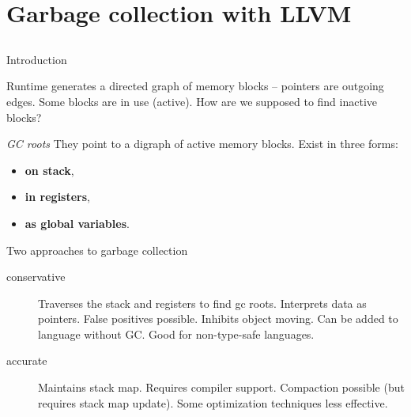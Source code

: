 \documentclass[8pt]{beamer}
\begin{document}
\section[Garbage collection]{Garbage collection with LLVM}
\subsection*{}

\begin{frame}{Introduction}
  \begin{alertblock}{}
    Runtime generates a directed graph of memory blocks -- pointers are
    outgoing edges. Some blocks are in use (active). How are we supposed to
    find inactive blocks?
  \end{alertblock}

  \begin{block}{\textit{GC roots}}
    They point to a digraph of active memory blocks. Exist in three forms:
    \begin{itemize}
      \item \textbf{on stack},
      \item \textbf{in registers},
      \item \textbf{as global variables}.
    \end{itemize}
  \end{block}

  \begin{block}{Two approaches to garbage collection}
    \begin{description}
      \item[conservative] Traverses the stack and registers to find gc roots.
        Interprets data as pointers. False positives possible. Inhibits object
        moving. Can be added to language without GC. Good for non-type-safe
        languages. 
      \item[accurate] Maintains stack map. Requires compiler support.
        Compaction possible (but requires stack map update). Some optimization
        techniques less effective.
    \end{description}
  \end{block}
\end{frame}
\end{document}
